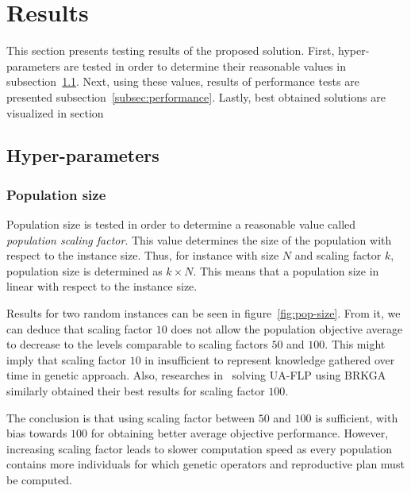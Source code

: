 \section{Results}\label{sec:results}

This section presents testing results of the proposed solution.
First, hyper-parameters are tested in order to determine their reasonable values in subsection~\ref{subsec:hyper-parameters}.
Next, using these values, results of performance tests are presented subsection~\ref{subsec:performance}.
Lastly, best obtained solutions are visualized in section

\subsection{Hyper-parameters}\label{subsec:hyper-parameters}

\subsubsection{Population size}

Population size is tested in order to determine a reasonable value called \textit{population scaling factor}.
This value determines the size of the population with respect to the instance size.
Thus, for instance with size $N$ and scaling factor $k$, population size is determined as
$k \times N$.
This means that a population size in linear with respect to the instance size.

Results for two random instances can be seen in figure~\ref{fig:pop-size}.
From it, we can deduce that scaling factor $10$ does not allow
the population objective average to decrease to the levels comparable to scaling factors $50$ and $100$.
This might imply that scaling factor $10$ in insufficient to represent knowledge gathered over time
in genetic approach.
Also, researches in~\cite{goncalvesBiasedRandomkeyGenetic2015} solving UA-FLP using BRKGA
similarly obtained their best results for scaling factor $100$.


The conclusion is that using scaling factor between $50$ and $100$ is sufficient, with bias towards $100$
for obtaining better average objective performance.
However, increasing scaling factor leads to slower computation speed as every population contains
more individuals for which genetic operators and reproductive plan must be computed.





